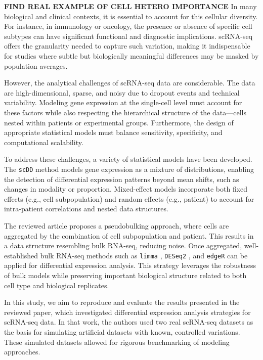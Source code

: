\documentclass[a4paper, 11pt, twocolumn]{article}
\begin{document}
\textbf{FIND REAL EXAMPLE OF CELL HETERO IMPORTANCE}
In many biological and clinical contexts, it is essential to account for this cellular diversity. For instance, in immunology or oncology, the presence or absence of specific cell subtypes can have significant functional and diagnostic implications. scRNA-seq offers the granularity needed to capture such variation, making it indispensable for studies where subtle but biologically meaningful differences may be masked by population averages.

However, the analytical challenges of scRNA-seq data are considerable. The data are high-dimensional, sparse, and noisy due to dropout events and technical variability. Modeling gene expression at the single-cell level must account for these factors while also respecting the hierarchical structure of the data—cells nested within patients or experimental groups. Furthermore, the design of appropriate statistical models must balance sensitivity, specificity, and computational scalability.

To address these challenges, a variety of statistical models have been developed. The \texttt{scDD} method \citep{scdd} models gene expression as a mixture of distributions, enabling the detection of differential expression patterns beyond mean shifts, such as changes in modality or proportion. Mixed-effect models  incorporate both fixed effects (e.g., cell subpopulation) and random effects (e.g., patient) to account for intra-patient correlations and nested data structures.

The reviewed article \citep{muscat} proposes a pseudobulking approach, where cells are aggregated by the combination of cell subpopulation and patient. This results in a data structure resembling bulk RNA-seq, reducing noise. Once aggregated, well-established bulk RNA-seq methods such as \texttt{limma} \citep{limma}, \texttt{DESeq2} \citep{deseq2}, and \texttt{edgeR} \citep{edger} can be applied for differential expression analysis. This strategy leverages the robustness of bulk models while preserving important biological structure related to both cell type and biological replicates.


In this study, we aim to reproduce and evaluate the results presented in the reviewed paper, which investigated differential expression analysis strategies for scRNA-seq data. In that work, the authors used two real scRNA-seq datasets as the basis for simulating artificial datasets with known, controlled variations. These simulated datasets allowed for rigorous benchmarking of modeling approaches.
\end{document}
